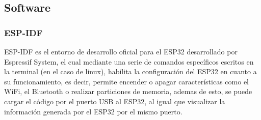 \subsection{Software}

\subsubsection{ESP-IDF}

ESP-IDF es el entorno de desarrollo oficial para el ESP32 desarrollado por Espressif System, el cual mediante una serie de comandos específicos escritos en la terminal (en el caso de linux), habilita la configuración del ESP32 en cuanto a su funcionamiento, es decir, permite encender o apagar características como el WiFi, el Bluetooth o realizar particiones de memoria, ademas de esto, se puede cargar el código por el puerto USB al ESP32, al igual que visualizar la información generada por el ESP32 por el mismo puerto. \cite{ES}\\